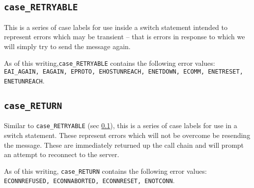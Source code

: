 \documentclass[12pt]{article}
\newcommand{\mono}[1]{\texttt{#1}}
\begin{document}
\subsection{\mono{case\_RETRYABLE}}
\label{def:case}
This is a series of case labels for use inside a switch statement intended
to represent errors which may be transient -- that is errors in response to
which we will simply try to send the message again.

As of this writing,\mono{case\_RETRYABLE} contains the following error values:
\mono{EAI\_AGAIN, EAGAIN, EPROTO, EHOSTUNREACH, ENETDOWN, ECOMM, ENETRESET,
ENETUNREACH}.
\subsection{\mono{case\_RETURN}}
Similar to \mono{case\_RETRYABLE} (sec \ref{def:case}), this is a series of case
labels for use in a switch statement. These represent errors which will not
be overcome be resending the message. These are immediately returned up the
call chain and will prompt an attempt to reconnect to the server.

As of this writing, \mono{case\_RETURN} contains the following error values:
\mono{ECONNREFUSED, ECONNABORTED, ECONNRESET, ENOTCONN}.
\end{document}
